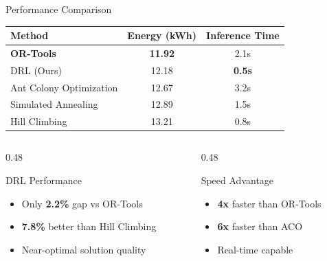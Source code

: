 \documentclass[aspectratio=169,11pt]{beamer}
\begin{document}
\begin{frame}{Performance Comparison}
    \begin{center}
        \begin{tabular}{lcc}
            \toprule
            \textbf{Method} & \textbf{Energy (kWh)} & \textbf{Inference Time} \\
            \midrule
            \textbf{OR-Tools} & \textbf{11.92} & 2.1s \\
            DRL (Ours) & 12.18 & \textbf{0.5s} \\
            Ant Colony Optimization & 12.67 & 3.2s \\
            Simulated Annealing & 12.89 & 1.5s \\
            Hill Climbing & 13.21 & 0.8s \\
            \bottomrule
        \end{tabular}
    \end{center}
    
    \vspace{0.5cm}
    \begin{columns}[T]
        \begin{column}{0.48\textwidth}
            \begin{exampleblock}{DRL Performance}
                \begin{itemize}
                    \item Only \textbf{2.2\%} gap vs OR-Tools
                    \item \textbf{7.8\%} better than Hill Climbing
                    \item Near-optimal solution quality
                \end{itemize}
            \end{exampleblock}
        \end{column}
        \begin{column}{0.48\textwidth}
            \begin{exampleblock}{Speed Advantage}
                \begin{itemize}
                    \item \textbf{4x} faster than OR-Tools
                    \item \textbf{6x} faster than ACO
                    \item Real-time capable
                \end{itemize}
            \end{exampleblock}
        \end{column}
    \end{columns}
\end{frame}
\end{document}

